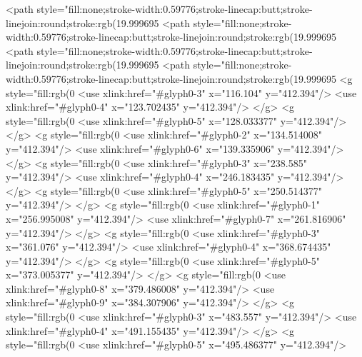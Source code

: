 <path style="fill:none;stroke-width:0.59776;stroke-linecap:butt;stroke-linejoin:round;stroke:rgb(19.999695%
<path style="fill:none;stroke-width:0.59776;stroke-linecap:butt;stroke-linejoin:round;stroke:rgb(19.999695%
<path style="fill:none;stroke-width:0.59776;stroke-linecap:butt;stroke-linejoin:round;stroke:rgb(19.999695%
<path style="fill:none;stroke-width:0.59776;stroke-linecap:butt;stroke-linejoin:round;stroke:rgb(19.999695%
<g style="fill:rgb(0%
  <use xlink:href="#glyph0-3" x="116.104" y="412.394"/>
  <use xlink:href="#glyph0-4" x="123.702435" y="412.394"/>
</g>
<g style="fill:rgb(0%
  <use xlink:href="#glyph0-5" x="128.033377" y="412.394"/>
</g>
<g style="fill:rgb(0%
  <use xlink:href="#glyph0-2" x="134.514008" y="412.394"/>
  <use xlink:href="#glyph0-6" x="139.335906" y="412.394"/>
</g>
<g style="fill:rgb(0%
  <use xlink:href="#glyph0-3" x="238.585" y="412.394"/>
  <use xlink:href="#glyph0-4" x="246.183435" y="412.394"/>
</g>
<g style="fill:rgb(0%
  <use xlink:href="#glyph0-5" x="250.514377" y="412.394"/>
</g>
<g style="fill:rgb(0%
  <use xlink:href="#glyph0-1" x="256.995008" y="412.394"/>
  <use xlink:href="#glyph0-7" x="261.816906" y="412.394"/>
</g>
<g style="fill:rgb(0%
  <use xlink:href="#glyph0-3" x="361.076" y="412.394"/>
  <use xlink:href="#glyph0-4" x="368.674435" y="412.394"/>
</g>
<g style="fill:rgb(0%
  <use xlink:href="#glyph0-5" x="373.005377" y="412.394"/>
</g>
<g style="fill:rgb(0%
  <use xlink:href="#glyph0-8" x="379.486008" y="412.394"/>
  <use xlink:href="#glyph0-9" x="384.307906" y="412.394"/>
</g>
<g style="fill:rgb(0%
  <use xlink:href="#glyph0-3" x="483.557" y="412.394"/>
  <use xlink:href="#glyph0-4" x="491.155435" y="412.394"/>
</g>
<g style="fill:rgb(0%
  <use xlink:href="#glyph0-5" x="495.486377" y="412.394"/>
